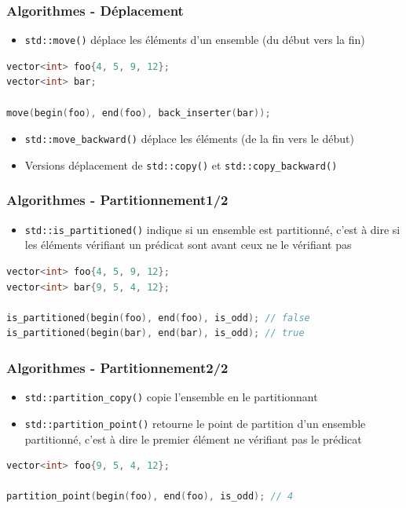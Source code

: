 \documentclass[C++.tex]{subfiles}
\begin{document}
\begin{frame}[fragile]
	\frametitle{Algorithmes - Déplacement}
	\begin{itemize}
		\item \lstinline|std::move()| déplace les éléments d'un ensemble (du début vers la fin)
	\end{itemize}

	\begin{lstlisting}[language=C++]
vector<int> foo{4, 5, 9, 12};
vector<int> bar;

move(begin(foo), end(foo), back_inserter(bar));\end{lstlisting}

	\begin{itemize}
		\item \lstinline|std::move_backward()| déplace les éléments (de la fin vers le début)
		\item Versions \og déplacement\fg{} de \lstinline|std::copy()| et \lstinline|std::copy_backward()|
	\end{itemize}
\end{frame}

\begin{frame}[fragile]
	\frametitle{Algorithmes - Partitionnement\titlehfill{}1/2}
	\begin{itemize}
		\item \lstinline|std::is_partitioned()| indique si un ensemble est partitionné, c'est à dire si les éléments vérifiant un prédicat sont avant ceux ne le vérifiant pas
	\end{itemize}

	\begin{lstlisting}[language=C++]
vector<int> foo{4, 5, 9, 12};
vector<int> bar{9, 5, 4, 12};

is_partitioned(begin(foo), end(foo), is_odd); // false
is_partitioned(begin(bar), end(bar), is_odd); // true\end{lstlisting}
\end{frame}

\begin{frame}[fragile]
	\frametitle{Algorithmes - Partitionnement\titlehfill{}2/2}
	\begin{itemize}
		\item \lstinline|std::partition_copy()| copie l'ensemble en le partitionnant
		\item \lstinline|std::partition_point()| retourne le point de partition d'un ensemble partitionné, c'est à dire le premier élément ne vérifiant pas le prédicat
	\end{itemize}

	\begin{lstlisting}[language=C++]
vector<int> foo{9, 5, 4, 12};

partition_point(begin(foo), end(foo), is_odd); // 4\end{lstlisting}
\end{frame}
\end{document}
